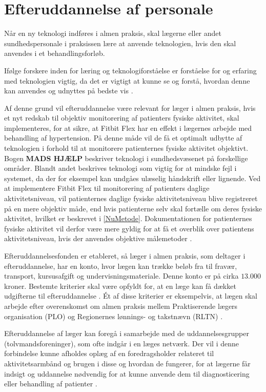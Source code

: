  \section{Efteruddannelse af personale}
\label{sec:efteruddannelse}
Når en ny teknologi indføres i almen praksis, skal lægerne eller andet sundhedspersonale i praksissen lære at anvende teknologien, hvis den skal anvendes i et behandlingsforløb. 

Ifølge forskere inden for læring og teknologiforståelse er forståelse for og erfaring med teknologien vigtig, da det er vigtigt at kunne se og forstå, hvordan denne kan anvendes og udnyttes på bedste vis \citep{aarhusuniversitet2013}. 

Af denne grund vil efteruddannelse være relevant for læger i almen praksis, hvis et nyt redskab til objektiv monitorering af patienters fysiske aktivitet, skal implementeres, for at sikre, at Fitbit Flex har en effekt i lægernes arbejde med behandling af hypertension. På denne måde vil de få et optimalt udbytte af teknologien i forhold til at monitorere patienternes fysiske aktivitet objektivt. Bogen \cite{hasse2012} \textbf{MADS HJÆLP} beskriver teknologi i sundhedsvæsenet på forskellige områder. Blandt andet beskrives teknologi som vigtig for at mindske fejl i systemet, da der for eksempel kan undgåes ulæselig håndskrift eller lignende. Ved at implementere Fitbit Flex til monitorering af patienters daglige aktivitetsniveau, vil patienternes daglige fysiske aktivitetsniveau blive registreret på en mere objektiv måde, end hvis patienterne selv skal fortælle om deres fysiske aktivitet, hvilket er beskrevet i \autoref{NuMetode}. Dokumentationen for patienternes fysiske aktivitet vil derfor være mere gyldig for at få et overblik over patientens aktivitetsniveau, hvis der anvendes objektive målemetoder \citep{hasse2012}. 

Efteruddannelsesfonden er etableret, så læger i almen praksis, som deltager i efteruddannelse, har en konto, hvor lægen kan trække beløb fra til fravær, transport, kursusafgift og undervisningsmateriale. Denne konto er på cirka $13.000$ kroner. Bestemte kriterier skal være opfyldt for, at en læge kan få dækket udgifterne til efteruddannelse \citep{vedsted2005}. Ét af disse kriterier er eksempelvis, at lægen skal arbejde efter overenskomst om almen praksis mellem Praktiserende lægers organisation (PLO) og Regionernes lønnings- og takstnævn (RLTN) \citep{fondenforalmenpraksis2016}. 

Efteruddannelse af læger kan foregå i samarbejde med de uddannelsesgrupper (tolvmandsforeninger), som ofte indgår i en læges netværk. Der vil i denne forbindelse kunne afholdes oplæg af en foredragsholder relateret til aktivitetsarmbånd og brugen i disse og hvordan de fungerer, for at lægerne får indsigt og uddannelse nødvendig for at kunne anvende dem til diagnosticering eller behandling af patienter \citep{vedsted2005}. 

